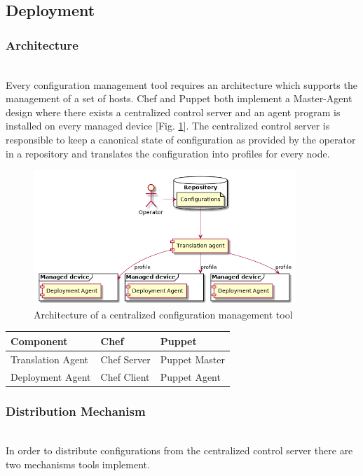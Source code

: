 \subsection{Deployment}

\subsubsection{Architecture}\hfill\\
Every configuration management tool requires an architecture which supports the management of a set of hosts. Chef and Puppet both implement a Master-Agent design where there exists a centralized control server and an agent program is installed on every managed device [Fig. \ref{fig:architecture}]. The centralized control server is responsible to keep a canonical state of configuration as provided by the operator in a repository and translates the configuration into profiles for every node.

\begin{figure}
\includegraphics[height=2in]{assets/architecture}
\caption{Architecture of a centralized configuration management tool \cite{delaet2010survey}}
\label{fig:architecture}
\end{figure}

\begin{table}[H]
\begin{tabular}{lll}
\toprule
Component & Chef & Puppet \\
\midrule
Translation Agent  & Chef Server  & Puppet Master \\
Deployment Agent & Chef Client & Puppet Agent \\
\end{tabular}
\end{table}


\subsubsection{Distribution Mechanism}\hfill\\
In order to distribute configurations from the centralized control server there are two mechanisms tools implement.

